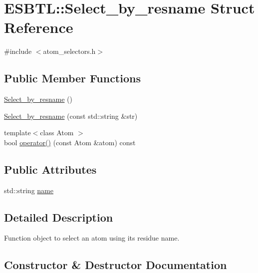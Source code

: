 \hypertarget{structESBTL_1_1Select__by__resname}{}\section{E\+S\+B\+TL\+:\+:Select\+\_\+by\+\_\+resname Struct Reference}
\label{structESBTL_1_1Select__by__resname}


{\ttfamily \#include $<$atom\+\_\+selectors.\+h$>$}

\subsection*{Public Member Functions}
\begin{DoxyCompactItemize}
\item 
\hyperlink{structESBTL_1_1Select__by__resname_a304bbff37f2cc7a66bc0831087eebbee}{Select\+\_\+by\+\_\+resname} ()
\item 
\hyperlink{structESBTL_1_1Select__by__resname_a9eac5c62ef399d2ad4dd47c52f33e578}{Select\+\_\+by\+\_\+resname} (const std\+::string \&str)
\item 
{\footnotesize template$<$class Atom $>$ }\\bool \hyperlink{structESBTL_1_1Select__by__resname_a5ec4f547ef388ae1bcc8a439114c2039}{operator()} (const Atom \&atom) const
\end{DoxyCompactItemize}
\subsection*{Public Attributes}
\begin{DoxyCompactItemize}
\item 
std\+::string \hyperlink{structESBTL_1_1Select__by__resname_a4e5daa2b6242ddd71736a2893d08427e}{name}
\end{DoxyCompactItemize}


\subsection{Detailed Description}
Function object to select an atom using its residue name. 

\subsection{Constructor \& Destructor Documentation}
\mbox{\label{structESBTL_1_1Select__by__resname_a304bbff37f2cc7a66bc0831087eebbee}} 
